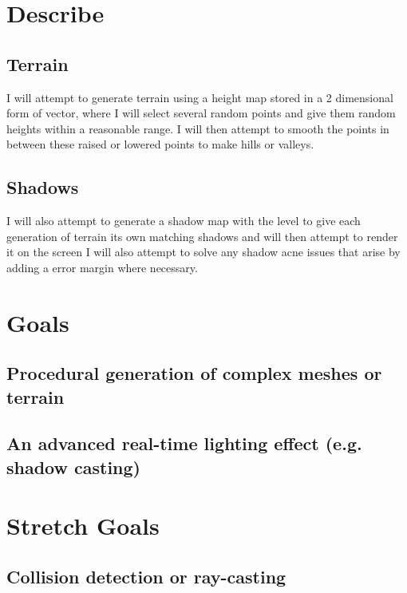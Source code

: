 \documentclass{scrartcl}
\begin{document}
\section*{Describe}
\subsection*{Terrain}
I will attempt to generate terrain using a height map stored in a 2 dimensional form of vector, where I will select several random points and give them random heights within a reasonable range. I will then attempt to smooth the points in between these raised or lowered points to make hills or valleys.
\subsection*{Shadows}
I will also attempt to generate a shadow map with the level to give each generation of terrain its own matching shadows and will then attempt to render it on the screen I will also attempt to solve any shadow acne issues that arise by adding a error margin where necessary.

\appendix
\section{Goals}
\subsection{Procedural generation of complex meshes or terrain}
\subsection{An advanced real-time lighting effect (e.g. shadow casting)}
\section{Stretch Goals}
\subsection{Collision detection or ray-casting}


\end{document}
